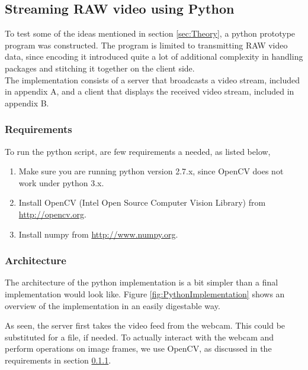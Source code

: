 \subsection{Streaming RAW video using Python}\label{subsec:python}
To test some of the ideas mentioned in section \ref{sec:Theory}, a python prototype program was constructed. The program is limited to transmitting RAW video data, since encoding it introduced quite a lot of additional complexity in handling packages and stitching it together on the client side.\\

The implementation consists of a server that broadcasts a video stream, included in appendix A, and a client that displays the received video stream, included in appendix B.

\subsubsection{Requirements}\label{subsubsec:requirements}
To run the python script, are few requirements a needed, as listed below,

\begin{enumerate}
    \item Make sure you are running python version 2.7.x, since OpenCV does not work under python 3.x.
    \item Install OpenCV (Intel Open Source Computer Vision Library) from \href{http://opencv.org}{http://opencv.org}.
    \item Install numpy from \href{http://www.numpy.org}{http://www.numpy.org}.
\end{enumerate}


\subsubsection{Architecture}
The architecture of the python implementation is a bit simpler than a final implementation would look like. Figure \ref{fig:PythonImplementation} shows an overview of the implementation in an easily digestable way.


As seen, the server first takes the video feed from the webcam. This could be substituted for a file, if needed. To actually interact with the webcam and perform operations on image frames, we use OpenCV, as discussed in the requirements in section \ref{subsubsec:requirements}.

